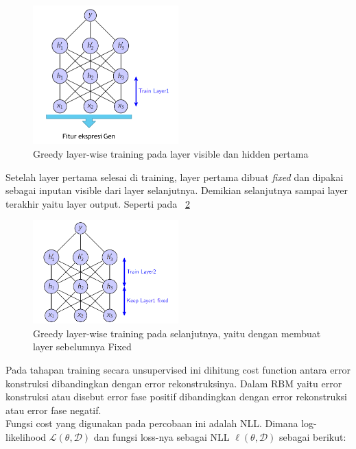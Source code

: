 \begin{figure}
	\centering
	\includegraphics[width=0.5\textwidth]
		{pics/greedy1.png}
	\caption{Greedy layer-wise training pada layer visible dan hidden pertama\citep{duh2014deep}}
	\label{fig:greedy1}
\end{figure}

Setelah layer pertama selesai di training, layer pertama dibuat \textit{fixed} dan dipakai sebagai inputan visible dari layer selanjutnya. Demikian selanjutnya sampai layer terakhir yaitu layer output. Seperti pada \pic~\ref{fig:greedy2}

\begin{figure}
	\centering
	\includegraphics[width=0.5\textwidth]
		{pics/greedy2.png}
	\caption{Greedy layer-wise training pada selanjutnya, yaitu dengan membuat layer sebelumnya Fixed \citep{duh2014deep}}
	\label{fig:greedy2}
\end{figure}

Pada tahapan training secara unsupervised ini dihitung cost function antara error konstruksi dibandingkan dengan error rekonstruksinya. Dalam RBM yaitu error konstruksi atau disebut error fase positif dibandingkan dengan error rekonstruksi atau error fase negatif.\\ Fungsi cost yang digunakan pada percobaan ini adalah NLL. Dimana log-likelihood $\mathcal{L}(\theta, \mathcal{D})$ dan fungsi loss-nya sebagai NLL $\ell (\theta, \mathcal{D})$ sebagai berikut:

